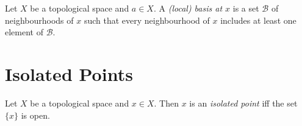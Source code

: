 \begin{df}
  Let $X$ be a topological space and $a \in X$. A \emph{(local) basis at $x$} is a set $\mathcal{B}$ of neighbourhoods of $x$ such that every neighbourhood of $x$ includes at least one element of $\mathcal{B}$.
\end{df}

\section{Isolated Points}

\begin{df}
  Let $X$ be a topological space and $x \in X$. Then $x$ is an \emph{isolated point} iff the set $\{x\}$ is open.
\end{df}
